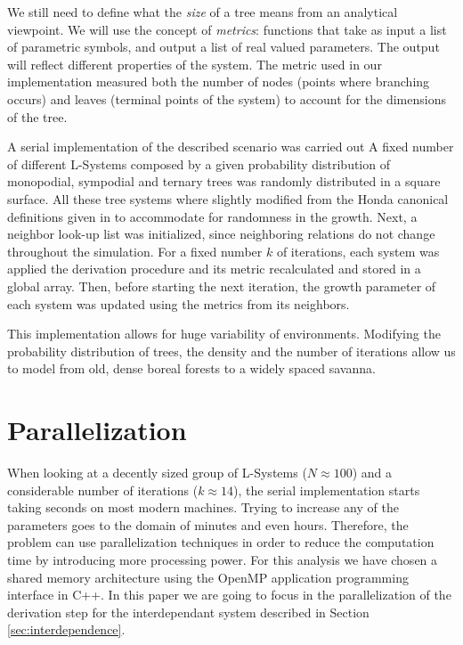 \documentclass[letterpaper,twoside,11pt]{article}
\begin{document}
\begin{multicols}{2}
 We still need to define what the \emph{size} of a tree means from an analytical viewpoint. We will use the concept of \emph{metrics}: functions that take as input a list of parametric symbols, and output a list of real valued parameters. The output will reflect different properties of the system. The metric used in our implementation measured both the number of nodes (points where branching occurs) and leaves (terminal points of the system) to account for the dimensions of the tree.

 A serial implementation of the described scenario was carried out%
 A fixed number of different L-Systems composed by a given probability distribution of monopodial, sympodial and ternary trees was randomly distributed in a square surface. All these tree systems where slightly modified from the Honda canonical definitions given in \cite{Prusinkiewicz:1996:ABP:235579} to accommodate for randomness in the growth. Next, a neighbor look-up list was initialized, since neighboring relations do not change throughout the simulation. For a fixed number $k$ of iterations, each system was applied the derivation procedure and its metric recalculated and stored in a global array. Then, before starting the next iteration, the growth parameter of each system was updated using the metrics from its neighbors.

This implementation allows for huge variability of environments. Modifying the probability distribution of trees, the density and the number of iterations allow us to model from old, dense boreal forests to a widely spaced savanna.




\vspace{-2em}

\section{Parallelization} %
\label{sec:parallelization}

When looking at a decently sized group of L-Systems ($N \approx 100$) and a considerable number of iterations ($k \approx 14$), the serial implementation starts taking seconds on most modern machines. Trying to increase any of the parameters goes to the domain of minutes and even hours. Therefore, the problem can use parallelization techniques in order to reduce the computation time by introducing more processing power. For this analysis we have chosen a shared memory architecture using the OpenMP application programming interface in C++. In this paper we are going to focus in the parallelization of the derivation step for the interdependant system described in Section \ref{sec:interdependence}.


\end{multicols}
\end{document}

